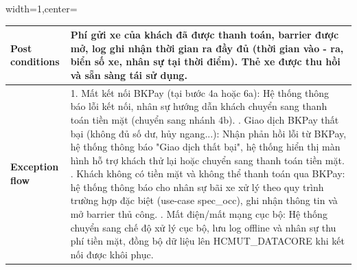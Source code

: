 \begin{adjustbox}{width=1\textwidth,center=\textwidth}
\small
\begin{tabular}{|>{\centering\arraybackslash}m{3.5cm}|m{13.2cm}|}
\hline
\textbf{Post conditions} & Phí gửi xe của khách đã được thanh toán, barrier được mở, log ghi nhận thời gian ra đầy đủ (thời gian vào - ra, biển số xe, nhân sự tại thời điểm). Thẻ xe được thu hồi và sẵn sàng tái sử dụng. \\ \hline
\textbf{Exception flow} &
1. Mất kết nối BKPay (tại bước 4a hoặc 6a): Hệ thống thông báo lỗi kết nối, nhân sự hướng dẫn khách chuyển sang thanh toán tiền mặt (chuyển sang nhánh 4b). \newline
2. Giao dịch BKPay thất bại (không đủ số dư, hủy ngang...): Nhận phản hồi lỗi từ BKPay, hệ thống thông báo "Giao dịch thất bại", hệ thống hiển thị màn hình hỗ trợ khách thử lại hoặc chuyển sang thanh toán tiền mặt. \newline
3. Khách không có tiền mặt và không thể thanh toán qua BKPay: hệ thống thông báo cho nhân sự bãi xe xử lý theo quy trình trường hợp đặc biệt (use-case spec\_occ), ghi nhận thông tin và mở barrier thủ công. \newline
4. Mất điện/mất mạng cục bộ: Hệ thống chuyển sang chế độ xử lý cục bộ, lưu log offline và nhân sự thu phí tiền mặt, đồng bộ dữ liệu lên HCMUT\_DATACORE khi kết nối được khôi phục. \\ \hline
\end{tabular}
\end{adjustbox}